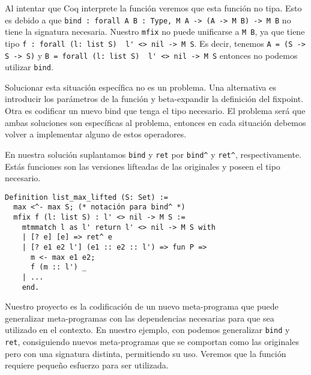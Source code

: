 Al intentar que Coq interprete la función veremos que esta función no tipa.
Esto es debido a que \lstinline{bind : forall A B : Type, M A -> (A -> M B) -> M B} no tiene la signatura necesaria.
Nuestro \lstinline{mfix} no puede unificarse a \lstinline{M B}, ya que tiene
tipo \lstinline{f : forall (l: list S)  l' <> nil -> M S}.
Es decir, tenemos \lstinline{A = (S -> S -> S)} y \lstinline{B = forall (l: list S)  l' <> nil -> M S} entonces no podemos utilizar \lstinline{bind}.

Solucionar esta situación específica no es un problema.
Una alternativa es introducir los parámetros de la función y beta-expandir la definición del fixpoint.
Otra es codificar un nuevo bind que tenga el tipo necesario.
El problema será que ambas soluciones son específicas al problema, entonces en cada situación debemos volver a implementar alguno de estos operadores.

En nuestra solución suplantamos \lstinline{bind} y \lstinline{ret} por \lstinline{bind^} y \lstinline{ret^}, respectivamente. Estás funciones son las versiones lifteadas de las originales y poseen el tipo necesario.

\begin{lstlisting}[float=h,frame=tb,caption={Teorema y prueba en Coq},label=lst:list_max_lifted]
Definition list_max_lifted (S: Set) :=
  max <^- max S; (* notación para bind^ *)
  mfix f (l: list S) : l' <> nil -> M S :=
    mtmmatch l as l' return l' <> nil -> M S with
    | [? e] [e] => ret^ e
    | [? e1 e2 l'] (e1 :: e2 :: l') => fun P =>
      m <- max e1 e2;
      f (m :: l') _
    | ...
    end.
\end{lstlisting}

Nuestro proyecto es la codificación de un nuevo meta-programa \lift que puede generalizar meta-programas con las dependencias necesarias para que sea utilizado en el contexto.
En nuestro ejemplo, con \lift podemos generalizar \lstinline{bind} y \lstinline{ret}, consiguiendo nuevos meta-programas que se comportan como las originales pero con una signatura distinta, permitiendo su uso.
Veremos que la función \lift requiere pequeño esfuerzo para ser utilizada.
